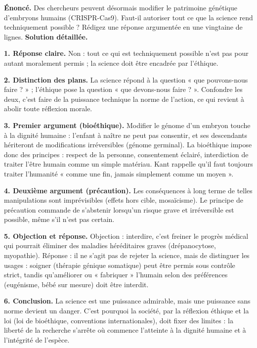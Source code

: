\documentclass[11pt]{article}
\newcommand{\cle}[1]{{\popxbold\color{popdark}#1}}
\begin{document}
\begin{exoresolu}
\textbf{Énoncé.} Des chercheurs peuvent désormais modifier le patrimoine génétique d'embryons humains (CRISPR-Cas9). Faut-il autoriser tout ce que la science rend techniquement possible ? Rédigez une réponse argumentée en une vingtaine de lignes.
\tcblower
\textbf{Solution détaillée.}

\textbf{1. Réponse claire.} Non : tout ce qui est techniquement possible n'est pas pour autant moralement permis ; la science doit être encadrée par l'éthique.

\textbf{2. Distinction des plans.} La science répond à la question « que pouvons-nous faire ? » ; l'éthique pose la question « que devons-nous faire ? ». Confondre les deux, c'est faire de la puissance technique la norme de l'action, ce qui revient à abolir toute réflexion morale.

\textbf{3. Premier argument (bioéthique).} Modifier le génome d'un embryon touche à la dignité humaine : l'enfant à naître ne peut pas consentir, et ses descendants hériteront de modifications irréversibles (génome germinal). La \cle{bioéthique} impose donc des principes : respect de la personne, consentement éclairé, interdiction de traiter l'être humain comme un simple matériau. Kant rappelle qu'il faut toujours traiter l'humanité « comme une fin, jamais simplement comme un moyen ».

\textbf{4. Deuxième argument (précaution).} Les conséquences à long terme de telles manipulations sont imprévisibles (effets hors cible, mosaïcisme). Le \cle{principe de précaution} commande de s'abstenir lorsqu'un risque grave et irréversible est possible, même s'il n'est pas certain.

\textbf{5. Objection et réponse.} Objection : interdire, c'est freiner le progrès médical qui pourrait éliminer des maladies héréditaires graves (drépanocytose, myopathie). Réponse : il ne s'agit pas de rejeter la science, mais de distinguer les usages : soigner (thérapie génique somatique) peut être permis sous contrôle strict, tandis qu'améliorer ou « fabriquer » l'humain selon des préférences (eugénisme, bébé sur mesure) doit être interdit.

\textbf{6. Conclusion.} La science est une puissance admirable, mais une puissance sans norme devient un danger. C'est pourquoi la société, par la réflexion éthique et la loi (loi de bioéthique, conventions internationales), doit fixer des limites : la liberté de la recherche s'arrête où commence l'atteinte à la dignité humaine et à l'intégrité de l'espèce.
\end{exoresolu}
\end{document}
